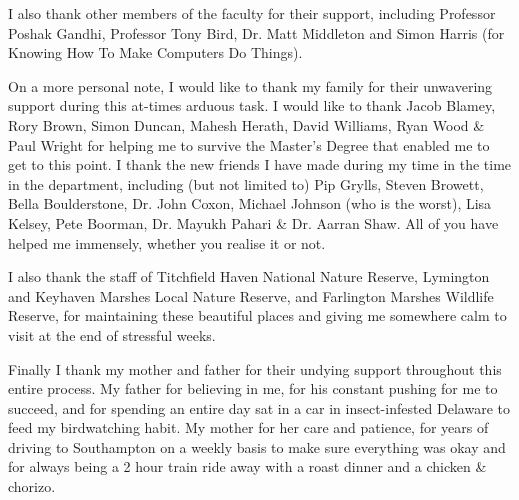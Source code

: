\par I also thank other members of the faculty for their support, including Professor Poshak Gandhi, Professor Tony Bird, Dr. Matt Middleton and Simon Harris (for Knowing How To Make Computers Do Things).
\par On a more personal note, I would like to thank my family for their unwavering support during this at-times arduous task.  I would like to thank Jacob Blamey, Rory Brown, Simon Duncan, Mahesh Herath, David Williams, Ryan Wood \& Paul Wright for helping me to survive the Master's Degree that enabled me to get to this point.  I thank the new friends I have made during my time in the time in the department, including (but not limited to) Pip Grylls, Steven Browett, Bella Boulderstone, Dr. John Coxon, Michael Johnson (who is the worst), Lisa Kelsey, Pete Boorman, Dr. Mayukh Pahari \& Dr. Aarran Shaw.  All of you have helped me immensely, whether you realise it or not.
\par I also thank the staff of Titchfield Haven National Nature Reserve, Lymington and Keyhaven Marshes Local Nature Reserve, and Farlington Marshes Wildlife Reserve, for maintaining these beautiful places and giving me somewhere calm to visit at the end of stressful weeks.
\par Finally I thank my mother and father for their undying support throughout this entire process.  My father for believing in me, for his constant pushing for me to succeed, and for spending an entire day sat in a car in insect-infested Delaware to feed my birdwatching habit.  My mother for her care and patience, for years of driving to Southampton on a weekly basis to make sure everything was okay and for always being a 2 hour train ride away with a roast dinner and a chicken \& chorizo.